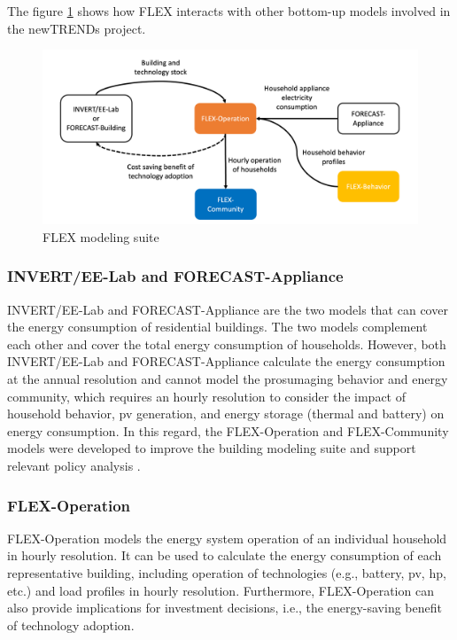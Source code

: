 The figure \ref{fig:flex} shows how FLEX interacts with other bottom-up models involved in the newTRENDs project.

\begin{figure}[h]
  \centering
  \includegraphics[width=\textwidth]{Images/flex.png}
  \caption{FLEX modeling suite}
  \label{fig:flex}
\end{figure}


\subsubsection{INVERT/EE-Lab and FORECAST-Appliance}


INVERT/EE-Lab and FORECAST-Appliance are the two models that can cover the energy consumption of residential buildings. The two models complement each other and cover the total energy consumption of households. 
However, both INVERT/EE-Lab and FORECAST-Appliance calculate the energy consumption at the annual resolution and cannot model the prosumaging behavior and energy community, which requires an hourly resolution to consider the impact of household behavior, \gls{pv} generation, and energy storage (thermal and battery) on energy consumption. 
In this regard, the FLEX-Operation and FLEX-Community models were developed to improve the building modeling suite and support relevant policy analysis \cite{newtrends}. 


\subsubsection{FLEX-Operation}


FLEX-Operation models the energy system operation of an individual household in hourly resolution.  
It can be used to calculate the energy consumption of each representative building, including operation of technologies (e.g., battery, \gls{pv}, \gls{hp}, etc.) and load profiles in hourly resolution. 
Furthermore, FLEX-Operation can also provide implications for investment decisions, i.e., the energy-saving benefit of technology adoption. 

